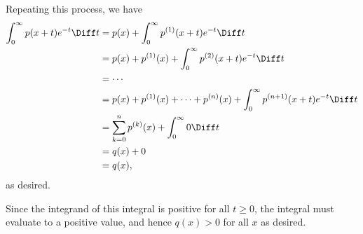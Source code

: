 \begin{enumerate}
\begin{enumerate}
                    Repeating this process, we have
                    \begin{align*}
                        \int_{0}^{\infty} p(x + t) e^{-t} \Diff t & = p(x) + \int_{0}^{\infty} p^{(1)} (x + t) e^{-t} \Diff t                                          \\
                                                                  & = p(x) + p^{(1)} (x) + \int_{0}^{\infty} p^{(2)} (x + t) e^{-t} \Diff t                            \\
                                                                  & = \cdots                                                                                           \\
                                                                  & = p(x) + p^{(1)} (x) + \cdots + p^{(n)} (x) + \int_{0}^{\infty} p^{(n + 1)} (x + t) e^{-t} \Diff t \\
                                                                  & = \sum_{k = 0}^{n} p^{(k)}(x) + \int_{0}^{\infty} 0 \Diff t                                        \\
                                                                  & = q(x) + 0                                                                                         \\
                                                                  & = q(x),
                    \end{align*}
                    as desired.

                    Since the integrand of this integral is positive for all \(t \geq 0\), the integral must evaluate to a positive value, and hence \(q(x) > 0\) for all \(x\) as desired.
          \end{enumerate}
\end{enumerate}